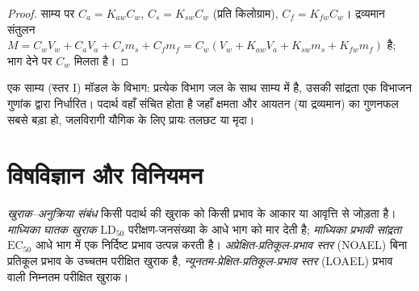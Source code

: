 \begin{proof}
साम्य पर $C_a = K_{aw}C_w$, $C_s = K_{sw}C_w$ (प्रति किलोग्राम), $C_f = K_{fw}C_w$। द्रव्यमान संतुलन
$M = C_wV_w + C_aV_a + C_sm_s + C_fm_f = C_w(V_w + K_{aw}V_a + K_{sw}m_s + K_{fw}m_f)$ है; भाग देने पर $C_w$ मिलता है।
\end{proof}

\begin{omfigure}

{\small एक साम्य (स्तर I) मॉडल के विभाग: प्रत्येक विभाग जल के साथ
साम्य में है, उसकी सांद्रता एक विभाजन गुणांक द्वारा निर्धारित।
पदार्थ वहाँ संचित होता है जहाँ क्षमता और आयतन (या द्रव्यमान) का गुणनफल
सबसे बड़ा हो, जलविरागी यौगिक के लिए प्रायः तलछट या मृदा।}
\end{omfigure}

\section{विषविज्ञान और विनियमन}

\begin{definition}[खुराक--अनुक्रिया]\label{def:b3:environmental-toxicology:dose}
\emph{खुराक--अनुक्रिया संबंध} किसी पदार्थ की
खुराक को किसी प्रभाव के आकार या आवृत्ति से जोड़ता है। \emph{माध्यिका
घातक खुराक} $\mathrm{LD_{50}}$ परीक्षण-जनसंख्या के आधे भाग को मार देती है;
\emph{माध्यिका प्रभावी सांद्रता} $\mathrm{EC_{50}}$
आधे भाग में एक निर्दिष्ट प्रभाव उत्पन्न करती है। \emph{अप्रेक्षित-प्रतिकूल-प्रभाव
स्तर} (NOAEL) बिना प्रतिकूल प्रभाव के उच्चतम परीक्षित खुराक
है, \emph{न्यूनतम-प्रेक्षित-प्रतिकूल-प्रभाव
स्तर} (LOAEL) प्रभाव वाली निम्नतम परीक्षित खुराक।
\end{definition}

